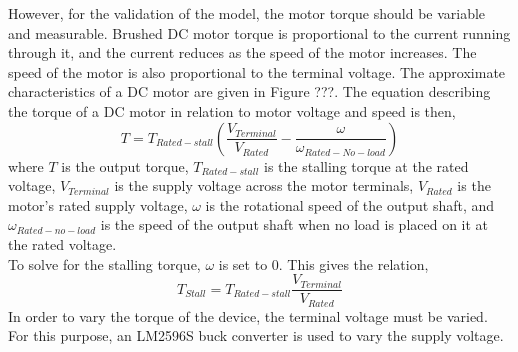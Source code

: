 However, for the validation of the model, the motor torque should be variable and measurable. Brushed DC motor torque is proportional to the current running through it, and the current reduces as the speed of the motor increases. The speed of the motor is also proportional to the terminal voltage. The approximate characteristics of a DC motor are given in Figure ???. The equation describing the torque of a DC motor in relation to motor voltage and speed is then,
\begin{equation}
	T = T_{Rated-stall}(\frac{V_{Terminal}}{V_{Rated}}-\frac{\omega}{\omega_{Rated-No-load}})
\end{equation}
where $T$ is the output torque, $T_{Rated-stall}$ is the stalling torque at the rated voltage, $V_{Terminal}$ is the supply voltage across the motor terminals, $V_{Rated}$ is the motor's rated supply voltage, $\omega$ is the rotational speed of the output shaft, and $\omega_{Rated-no-load}$ is the speed of the output shaft when no load is placed on it at the rated voltage.\\

To solve for the stalling torque, $\omega$ is set to $0$. This gives the relation,
\begin{equation}
	T_{Stall} = T_{Rated-stall}\frac{V_{Terminal}}{V_{Rated}}
\end{equation}
In order to vary the torque of the device, the terminal voltage must be varied. For this purpose, an LM2596S buck converter is used to vary the supply voltage.



%
